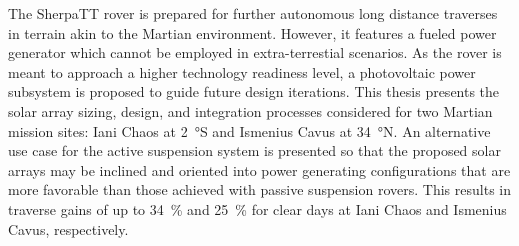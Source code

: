 \vspace{-3ex}

The SherpaTT rover is prepared for further autonomous long distance traverses in terrain akin to the Martian environment. However, it features a fueled power generator which cannot be employed in extra-terrestial scenarios. As the rover is meant to approach a higher technology readiness level, a photovoltaic power subsystem is proposed to guide future design iterations. This thesis presents the solar array sizing, design, and integration processes considered for two Martian mission sites: Iani Chaos at \SI{2}{\degree}S and Ismenius Cavus at \SI{34}{\degree}N. An alternative use case for the active suspension system is presented so that the proposed solar arrays may be inclined and oriented into power generating configurations that are more favorable than those achieved with passive suspension rovers. This results in traverse gains of up to \SI{34}{\percent} and \SI{25}{\percent} for clear days at Iani Chaos and Ismenius Cavus, respectively.
